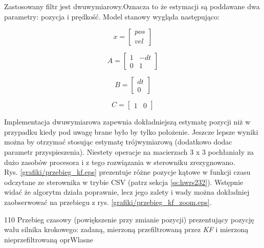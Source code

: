 Zastosowany filtr jest dwuwymiarowy.Oznacza to że estymacji są poddawane dwa parametry: pozycja i prędkość. Model stanowy wygląda następująco:

\begin{equation} \label{eq:alg6}
	x = \begin{bmatrix}
       	pos \\ 
       	vel
     	\end{bmatrix}
\end{equation}

\begin{equation} \label{eq:alg7}
	A = \begin{bmatrix}
       	1 & -dt \\ 
       	0 & 1
     	\end{bmatrix}
\end{equation}

\begin{equation} \label{eq:alg8}
	B = \begin{bmatrix}
       	dt \\ 
       	0
     	\end{bmatrix}
\end{equation}

\begin{equation} \label{eq:alg9}
	C = \begin{bmatrix}
       	1 & 0 
     	\end{bmatrix}
\end{equation}

Implementacja dwuwymiarowa zapewnia dokładniejszą estymatę pozycji niż w przypadku kiedy pod uwagę brane było by tylko położenie. Jeszcze lepsze wyniki można by otrzymać stosując estymatę trójwymiarową (dodatkowo dodac parametr przyspieszenia). Niestety operacje na macierzach 3 x 3 pochłaniały za dużo zasobów procesora i z tego rozwiązania w sterowniku zrezygnowano. \\

Rys. \ref{grafiki/przebieg_kf.eps} prezentuje różne pozycje kątowe w funkcji czasu odczytane ze sterownika w trybie CSV (patrz sekcja \ref{ss:hwrs232}). Wstępnie widać że algorytm działa poprawnie, lecz jego zalety i wady można dokładniej zaobserwować na przebiegu z rys. \ref{grafiki/przebieg_kf_zoom.eps}.

	{110}
	{Przebieg czasowy (powiększenie przy zmianie pozycji) prezentujący pozycję wału silnika krokowego: zadaną, mierzoną przefiltrowaną przez {\it KF} i  mierzoną nieprzefiltrowaną}
	{oprWlasne}
	
